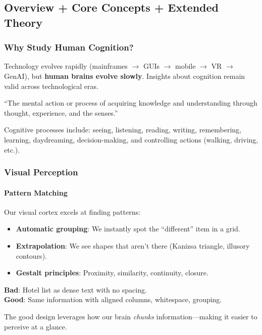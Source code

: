 \subsection{Overview + Core Concepts + Extended Theory}

\subsubsection*{Why Study Human Cognition?}

Technology evolves rapidly (mainframes $\to$ GUIs $\to$ mobile $\to$ VR $\to$ GenAI), but \textbf{human brains evolve slowly}. Insights about cognition remain valid across technological eras.

\begin{defbox}[Cognition]
``The mental action or process of acquiring knowledge and understanding through thought, experience, and the senses.''

Cognitive processes include: seeing, listening, reading, writing, remembering, learning, daydreaming, decision-making, and controlling actions (walking, driving, etc.).
\end{defbox}

\subsubsection*{Visual Perception}

\paragraph*{Pattern Matching}
Our visual cortex excels at finding patterns:
\begin{itemize}
  \item \textbf{Automatic grouping}: We instantly spot the ``different'' item in a grid.
  \item \textbf{Extrapolation}: We see shapes that aren't there (Kanizsa triangle, illusory contours).
  \item \textbf{Gestalt principles}: Proximity, similarity, continuity, closure.
\end{itemize}

\begin{exbox}
\textbf{Bad}: Hotel list as dense text with no spacing.\\
\textbf{Good}: Same information with aligned columns, whitespace, grouping.

The good design leverages how our brain \textit{chunks} information---making it easier to perceive at a glance.
\end{exbox}

